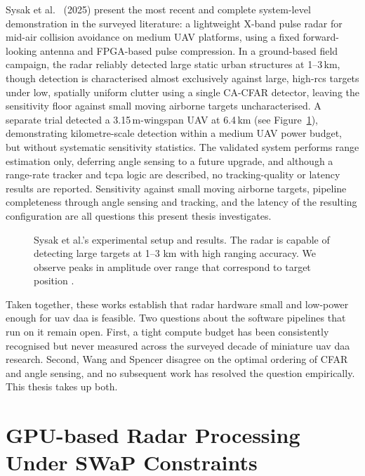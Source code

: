 Sysak et al.\
\cite{sysak2025_lightweight_compact_pulse_radar_uav_collision_avoidance} (2025)
present the most recent and complete system-level demonstration in the surveyed 
literature: a lightweight X-band pulse radar for mid-air collision avoidance on
medium UAV platforms, using a fixed forward-looking antenna and FPGA-based pulse
compression. In a ground-based field campaign, the radar reliably detected large
static urban structures at 1--3\,km, though
detection is characterised almost exclusively against large, high-\gls{rcs}
targets under low, spatially uniform clutter using a single CA-CFAR detector,
leaving the sensitivity floor against small moving airborne targets
uncharacterised. A separate trial detected a 3.15\,m-wingspan UAV at 6.4\,km
(see Figure~\ref{fig:sysak}), demonstrating kilometre-scale detection within a
medium UAV power budget, but without systematic sensitivity statistics. The 
validated system performs range
estimation only, deferring angle sensing to a future upgrade, and although a
range-rate tracker and \gls{tcpa} logic are described, no tracking-quality or
latency results are reported. Sensitivity against small moving airborne targets, 
pipeline completeness through angle sensing and tracking, and the latency of the 
resulting configuration are all questions this present thesis investigates.

\begin{figure}
    \caption{Sysak et al.'s experimental setup and results. The radar is
    capable of detecting large targets at 1--3 km with high ranging accuracy.
    We observe peaks in amplitude over range that correspond to target position
    \cite{sysak2025_lightweight_compact_pulse_radar_uav_collision_avoidance}.}
    \label{fig:sysak}
\end{figure}

Taken together, these works establish that radar hardware small and low-power 
enough for \gls{uav} \gls{daa} is feasible. Two questions about the software 
pipelines that run on it remain open. First, a tight compute budget has been 
consistently recognised but never measured across the surveyed decade of miniature 
\gls{uav} \gls{daa} research. Second, Wang and Spencer disagree on the optimal 
ordering of CFAR and angle sensing, and no subsequent work has resolved the 
question empirically. This thesis takes up both.

\section{GPU-based Radar Processing Under SWaP Constraints}

